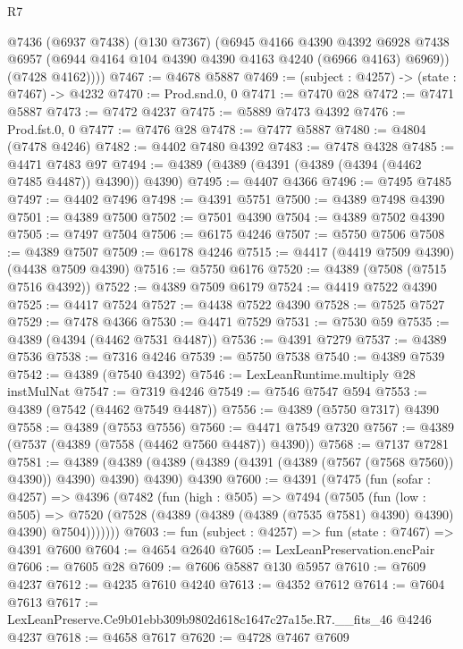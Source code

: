 \begin{lexlean}{R7}
\begin{coremodule}
        @7436
          (@6937 @7438)
          (@130 @7367)
          (@6945
            @4166
            @4390
            @4392
            @6928
            @7438
            @6957
            (@6944 @4164 @104 @4390 @4390 @4163 @4240 (@6966 @4163) @6969))
          (@7428 @4162))))
@7467 := @4678 @5887
@7469 := (subject : @4257) -> (state : @7467) -> @4232
@7470 := Prod.snd.{0, 0}
@7471 := @7470 @28
@7472 := @7471 @5887
@7473 := @7472 @4237
@7475 := @5889 @7473 @4392
@7476 := Prod.fst.{0, 0}
@7477 := @7476 @28
@7478 := @7477 @5887
@7480 := @4804 (@7478 @4246)
@7482 := @4402 @7480 @4392
@7483 := @7478 @4328
@7485 := @4471 @7483 @97
@7494 := @4389 (@4389 (@4391 (@4389 (@4394 (@4462 @7485 @4487)) @4390)) @4390)
@7495 := @4407 @4366
@7496 := @7495 @7485
@7497 := @4402 @7496
@7498 := @4391 @5751
@7500 := @4389 @7498 @4390
@7501 := @4389 @7500
@7502 := @7501 @4390
@7504 := @4389 @7502 @4390
@7505 := @7497 @7504
@7506 := @6175 @4246
@7507 := @5750 @7506
@7508 := @4389 @7507
@7509 := @6178 @4246
@7515 := @4417 (@4419 @7509 @4390) (@4438 @7509 @4390)
@7516 := @5750 @6176
@7520 := @4389 (@7508 (@7515 @7516 @4392))
@7522 := @4389 @7509 @6179
@7524 := @4419 @7522 @4390
@7525 := @4417 @7524
@7527 := @4438 @7522 @4390
@7528 := @7525 @7527
@7529 := @7478 @4366
@7530 := @4471 @7529
@7531 := @7530 @59
@7535 := @4389 (@4394 (@4462 @7531 @4487))
@7536 := @4391 @7279
@7537 := @4389 @7536
@7538 := @7316 @4246
@7539 := @5750 @7538
@7540 := @4389 @7539
@7542 := @4389 (@7540 @4392)
@7546 := LexLeanRuntime.multiply @28 instMulNat
@7547 := @7319 @4246
@7549 := @7546 @7547 @594
@7553 := @4389 (@7542 (@4462 @7549 @4487))
@7556 := @4389 (@5750 @7317) @4390
@7558 := @4389 (@7553 @7556)
@7560 := @4471 @7549 @7320
@7567 := @4389 (@7537 (@4389 (@7558 (@4462 @7560 @4487)) @4390))
@7568 := @7137 @7281
@7581 := @4389
    (@4389 (@4389 (@4389 (@4391 (@4389 (@7567 (@7568 @7560)) @4390)) @4390) @4390) @4390)
    @4390
@7600 := @4391
    (@7475
      (fun (sofar : @4257) =>
      @4396
        (@7482
          (fun (high : @505) =>
          @7494
            (@7505
              (fun (low : @505) =>
              @7520 (@7528 (@4389 (@4389 (@4389 (@7535 @7581) @4390) @4390) @4390) @7504)))))))
@7603 := fun (subject : @4257) => fun (state : @7467) => @4391 @7600
@7604 := @4654 @2640
@7605 := LexLeanPreservation.encPair
@7606 := @7605 @28
@7609 := @7606 @5887 @130 @5957
@7610 := @7609 @4237
@7612 := @4235 @7610 @4240
@7613 := @4352 @7612
@7614 := @7604 @7613
@7617 := LexLeanPreserve.Ce9b01ebb309b9802d618c1647c27a15e.R7.__fits_46 @4246 @4237
@7618 := @4658 @7617
@7620 := @4728 @7467 @7609

\end{coremodule}
\end{lexlean}
